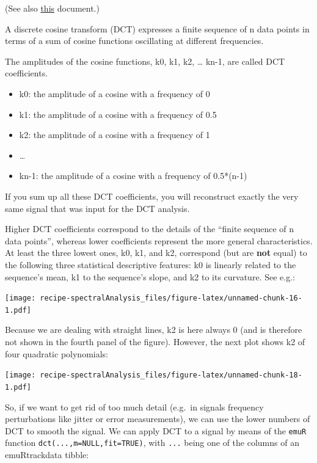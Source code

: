 \documentclass[]{book}
\providecommand{\tightlist}{%
  \setlength{\itemsep}{0pt}\setlength{\parskip}{0pt}}
\begin{document}
(See also \href{https://www.phonetik.uni-muenchen.de/~jmh/lehre/sem/ws0910/R/dct.pdf}{this} document.)

A discrete cosine transform (DCT) expresses a finite sequence of n data points in terms of a sum of cosine functions oscillating at different frequencies.

The amplitudes of the cosine functions, k0, k1, k2, \ldots{} kn-1, are called DCT coefficients.

\begin{itemize}
\tightlist
\item
  k0: the amplitude of a cosine with a frequency of 0
\item
  k1: the amplitude of a cosine with a frequency of 0.5
\item
  k2: the amplitude of a cosine with a frequency of 1
\item
  \ldots{}
\item
  kn-1: the amplitude of a cosine with a frequency of 0.5*(n-1)
\end{itemize}

If you sum up all these DCT coefficients, you will reconstruct exactly the very same signal that was input for the DCT analysis.

Higher DCT coefficients correspond to the details of the ``finite sequence of n data points'', whereas lower coefficients represent the more general characteristics. At least the three lowest ones, k0, k1, and k2, correspond (but are \textbf{not} equal) to the following three statistical descriptive features: k0 is linearly related to the sequence's mean, k1 to the sequence's slope, and k2 to its curvature. See e.g.:

\texttt{[image: recipe-spectralAnalysis\_files/figure-latex/unnamed-chunk-16-1.pdf]}

Because we are dealing with straight lines, k2 is here always 0 (and is therefore not shown in the fourth panel of the figure). However, the next plot shows k2 of four quadratic polynomials:

\texttt{[image: recipe-spectralAnalysis\_files/figure-latex/unnamed-chunk-18-1.pdf]}

So, if we want to get rid of too much detail (e.g.~in signals frequency perturbations like jitter or error measurements), we can use the lower numbers of DCT to smooth the signal. We can apply DCT to a signal by means of the \texttt{emuR} function \texttt{dct(...,m=NULL,fit=TRUE)}, with \texttt{...} being one of the columns of an emuRtrackdata tibble:
\end{document}
